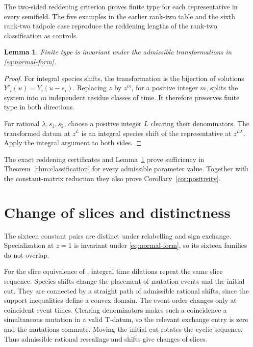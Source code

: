 \documentclass[11pt,a4paper]{article}
\newtheorem{lemma}[theorem]{Lemma}
\theoremstyle{definition}
\begin{document}
The two-sided reddening criterion
\cite[Proposition 2.7]{MizunoRankTwo} proves finite type for each
representative in every semifield. The five examples in the earlier
rank-two table and the sixth rank-two tadpole case reproduce the
reddening lengths of the rank-two classification as controls.

\begin{lemma}\label{lem:invariance}
Finite type is invariant under the admissible transformations
in \eqref{eq:normal-form}.
\end{lemma}
\begin{proof}
For integral species shifts, the transformation is the bijection of
solutions $Y'_i(u)=Y_i(u-s_i)$. Replacing $z$ by $z^m$, for a positive
integer $m$, splits the system into $m$ independent residue classes of
time. It therefore preserves finite type in both directions.

For rational $\lambda,s_1,s_2$, choose a positive integer $L$ clearing
their denominators. The transformed datum at $z^L$ is an integral
species shift of the representative at $z^{L\lambda}$. Apply the integral
argument to both sides.
\end{proof}

The exact reddening certificates and Lemma~\ref{lem:invariance} prove
sufficiency in Theorem~\ref{thm:classification} for every admissible
parameter value. Together with the constant-matrix reduction they also
prove Corollary~\ref{cor:positivity}.

\section{Change of slices and distinctness}\label{sec:slices}

The sixteen constant pairs are distinct under relabelling and sign
exchange. Specialization at $z=1$ is invariant under
\eqref{eq:normal-form}, so its sixteen families do not overlap.

For the slice equivalence of \cite[Section 3.1]{MizunoRankTwo}, integral
time dilations repeat the same slice sequence. Species shifts change
the placement of mutation events and the initial cut. They are connected
by a straight path of admissible rational shifts, since the support
inequalities define a convex domain. The event order changes only at
coincident event times. Clearing denominators makes such a coincidence
a simultaneous mutation in a valid T-datum, so the relevant exchange
entry is zero and the mutations commute. Moving the initial cut rotates
the cyclic sequence. Thus admissible rational rescalings and shifts
give changes of slices.
\end{document}
